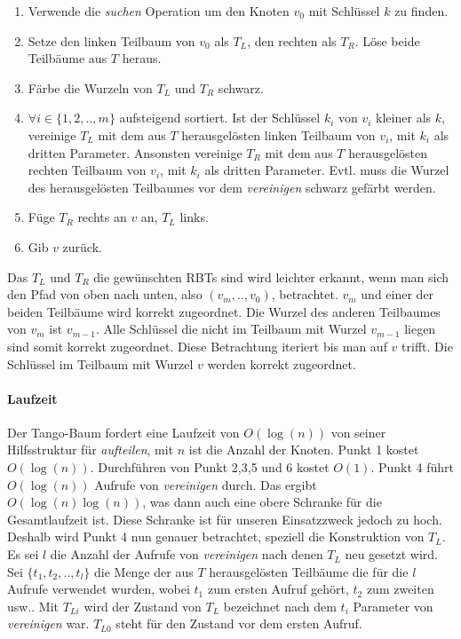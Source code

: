 \documentclass[a4paper,12pt]{article}
\begin{document}
\begin{enumerate}
	\item Verwende die \textit{suchen} Operation um den Knoten $v_0$ mit Schlüssel $k$ zu finden.
	\item Setze den linken Teilbaum von $v_0$ als $T_L$, den rechten als $T_R$. Löse beide Teilbäume aus $T$ heraus.
	\item Färbe die Wurzeln von $T_L$ und $T_R$ schwarz.
	\item $\forall i \in \{1,2,..,m\}$ aufsteigend sortiert. Ist der Schlüssel $k_i$ von $v_i$ kleiner als $k$, vereinige $T_L$ mit dem aus $T$ herausgelösten linken Teilbaum von $v_i$, mit  $k_i$ als dritten Parameter. Ansonsten vereinige $T_R$ mit dem aus $T$ herausgelösten rechten Teilbaum von $v_i$, mit  $k_i$ als dritten Parameter. Evtl. muss die Wurzel des herausgelösten Teilbaumes vor dem \textit{vereinigen} schwarz gefärbt werden. 
	\item Füge $T_R$ rechts an $v$ an, $T_L$ links.
	\item Gib $v$ zurück.
\end{enumerate}   
Das $T_L$ und $T_R$ die gewünschten RBTs sind wird leichter erkannt, wenn man sich den Pfad von oben nach unten, also $(v_m,..,v_0)$, betrachtet. $v_m$ und einer der beiden Teilbäume wird korrekt zugeordnet. Die Wurzel des anderen Teilbaumes von $v_m$ ist $v_{m-1}$. Alle Schlüssel die nicht im Teilbaum mit Wurzel $v_{m-1}$ liegen sind somit korrekt zugeordnet. Diese Betrachtung iteriert bis man auf $v$ trifft. Die Schlüssel im Teilbaum mit Wurzel $v$ werden korrekt zugeordnet. 

\paragraph{Laufzeit}
Der Tango-Baum fordert eine Laufzeit von $O(\log(n))$ von seiner Hilfsstruktur für \textit{aufteilen}, mit $n$ ist die Anzahl der Knoten. Punkt 1 kostet $O(\log(n))$. Durchführen von Punkt 2,3,5 und 6 kostet $O(1)$. Punkt 4 führt $O(\log (n))$ Aufrufe von \textit{vereinigen} durch. Das ergibt $O(\log (n) \log (n))$, was dann auch eine obere Schranke für die Gesamtlaufzeit ist. Diese Schranke ist für unseren Einsatzzweck jedoch zu hoch.\\ Deshalb wird Punkt 4 nun genauer betrachtet, speziell die Konstruktion von $T_L$. Es sei $l$ die Anzahl der Aufrufe von \textit{vereinigen} nach denen $T_L$ neu gesetzt wird. Sei $\{t_1,t_2,..,t_l\}$ die Menge der aus $T$ herausgelösten Teilbäume die für die $l$ Aufrufe verwendet wurden, wobei $t_1$ zum ersten Aufruf gehört, $t_2$ zum zweiten usw.. Mit $T_{Li}$ wird der Zustand von $T_L$ bezeichnet nach dem $t_i$ Parameter von \textit{vereinigen} war.  $T_{L0}$ steht für den Zustand vor dem ersten Aufruf.\\
\end{document}
